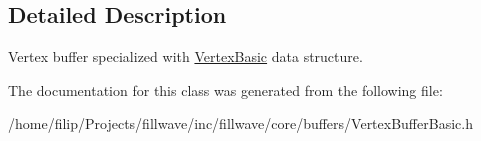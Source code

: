 \subsection{Detailed Description}
Vertex buffer specialized with \hyperlink{structfillwave_1_1core_1_1VertexBasic}{Vertex\+Basic} data structure. 

The documentation for this class was generated from the following file\+:\begin{DoxyCompactItemize}
\item 
/home/filip/\+Projects/fillwave/inc/fillwave/core/buffers/Vertex\+Buffer\+Basic.\+h\end{DoxyCompactItemize}
